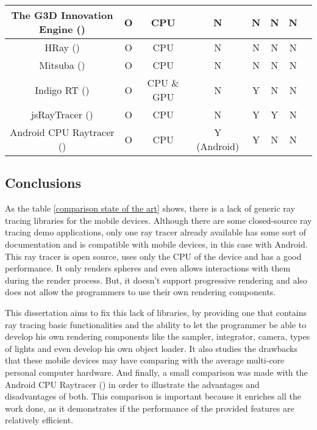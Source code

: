 \begin{table}[H]
\begin{tabular}{|c|c|c|c|c|c|c|c|}
The G3D Innovation Engine (\cite{G3D17})						& O	& CPU 				& N				& N                 		& N                 		& N\\ \hline
HRay (\cite{HRay})										& O     	& CPU                		& N                  		& N                      	& N				& N\\ \hline
Mitsuba (\cite{Mitsuba})										& O 	& CPU 				& N				& N                 		& N				& N\\ \hline
Indigo RT (\cite{IndigoRT})									& O 	& CPU \& GPU		& N				& Y                 		& N				& N\\ \hline
jsRayTracer (\cite{jsRayTracer})								& O 	& CPU 				& N				& Y                 		& Y				& N\\ \hline
Android CPU Raytracer (\cite{Android_CPU_Raytracer})			& O 	& CPU 				& Y (Android)		& Y                 		& N				& N\\ \hline
\end{tabular}
\normalsize
\end{table}

\subsection{Conclusions}


\par
As the table \ref{comparison state of the art} shows, there is a lack of generic ray tracing libraries for the mobile devices.
Although there are some closed-source ray tracing demo applications, only one ray tracer already available has some sort of documentation and is compatible with mobile devices, in this case with Android.
This ray tracer is open source, uses only the CPU of the device and has a good performance.
It only renders spheres and even allows interactions with them during the render process.
But, it doesn’t support progressive rendering and also does not allow the programmers to use their own rendering components.

\par
This dissertation aims to fix this lack of libraries, by providing one that contains ray tracing basic functionalities and the ability to let the programmer be able to develop his own rendering components like the sampler, integrator, camera, types of lights and even develop his own object loader.
It also studies the drawbacks that these mobile devices may have comparing with the average multi-core personal computer hardware.
And finally, a small comparison was made with the Android CPU Raytracer (\cite{Android_CPU_Raytracer}) in order to illustrate the advantages and disadvantages of both.
This comparison is important because it enriches all the work done, as it demonstrates if the performance of the provided features are relatively efficient.